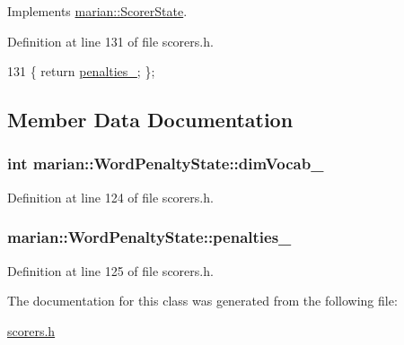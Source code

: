 Implements \hyperlink{classmarian_1_1ScorerState_a438e0327d2913a70bbebe80765e04395}{marian\+::\+Scorer\+State}.



Definition at line 131 of file scorers.\+h.


\begin{DoxyCode}
131 \{ \textcolor{keywordflow}{return} \hyperlink{classmarian_1_1WordPenaltyState_a716a4f8bba2055eab2bcaf121ce91fb7}{penalties\_}; \};
\end{DoxyCode}


\subsection{Member Data Documentation}
\subsubsection[{\texorpdfstring{dim\+Vocab\+\_\+}{dimVocab_}}]{\setlength{\rightskip}{0pt plus 5cm}int marian\+::\+Word\+Penalty\+State\+::dim\+Vocab\+\_\+\hspace{0.3cm}{\ttfamily [private]}}\hypertarget{classmarian_1_1WordPenaltyState_a24b1e41e0b8078130f117967c7ab6f9d}{}\label{classmarian_1_1WordPenaltyState_a24b1e41e0b8078130f117967c7ab6f9d}


Definition at line 124 of file scorers.\+h.

\subsubsection[{\texorpdfstring{penalties\+\_\+}{penalties_}}]{ marian\+::\+Word\+Penalty\+State\+::penalties\+\_\+\hspace{0.3cm}{\ttfamily [private]}}\hypertarget{classmarian_1_1WordPenaltyState_a716a4f8bba2055eab2bcaf121ce91fb7}{}\label{classmarian_1_1WordPenaltyState_a716a4f8bba2055eab2bcaf121ce91fb7}


Definition at line 125 of file scorers.\+h.



The documentation for this class was generated from the following file\+:\begin{DoxyCompactItemize}
\item 
\hyperlink{scorers_8h}{scorers.\+h}\end{DoxyCompactItemize}
